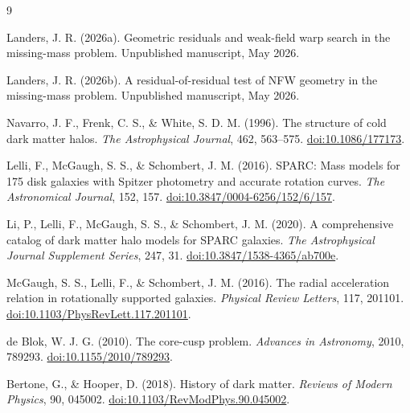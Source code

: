 \documentclass[10pt]{article}
\begin{document}
\clearpage

\begingroup\small
\begin{thebibliography}{9}

Landers, J. R. (2026a).
Geometric residuals and weak-field warp search in the missing-mass problem.
Unpublished manuscript, May 2026.

Landers, J. R. (2026b).
A residual-of-residual test of NFW geometry in the missing-mass problem.
Unpublished manuscript, May 2026.

Navarro, J. F., Frenk, C. S., \& White, S. D. M. (1996).
The structure of cold dark matter halos.
\emph{The Astrophysical Journal}, 462, 563--575.
\href{https://doi.org/10.1086/177173}{doi:10.1086/177173}.

Lelli, F., McGaugh, S. S., \& Schombert, J. M. (2016).
SPARC: Mass models for 175 disk galaxies with Spitzer photometry and accurate
rotation curves.
\emph{The Astronomical Journal}, 152, 157.
\href{https://doi.org/10.3847/0004-6256/152/6/157}{doi:10.3847/0004-6256/152/6/157}.

Li, P., Lelli, F., McGaugh, S. S., \& Schombert, J. M. (2020).
A comprehensive catalog of dark matter halo models for SPARC galaxies.
\emph{The Astrophysical Journal Supplement Series}, 247, 31.
\href{https://doi.org/10.3847/1538-4365/ab700e}{doi:10.3847/1538-4365/ab700e}.

McGaugh, S. S., Lelli, F., \& Schombert, J. M. (2016).
The radial acceleration relation in rotationally supported galaxies.
\emph{Physical Review Letters}, 117, 201101.
\href{https://doi.org/10.1103/PhysRevLett.117.201101}{doi:10.1103/PhysRevLett.117.201101}.

de Blok, W. J. G. (2010).
The core-cusp problem.
\emph{Advances in Astronomy}, 2010, 789293.
\href{https://doi.org/10.1155/2010/789293}{doi:10.1155/2010/789293}.

Bertone, G., \& Hooper, D. (2018).
History of dark matter.
\emph{Reviews of Modern Physics}, 90, 045002.
\href{https://doi.org/10.1103/RevModPhys.90.045002}{doi:10.1103/RevModPhys.90.045002}.

\end{thebibliography}
\endgroup
\end{document}

